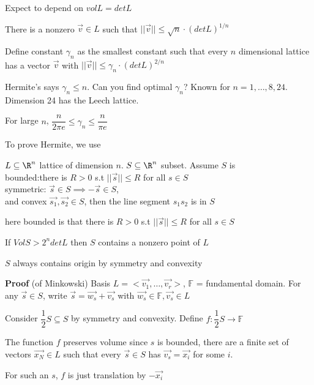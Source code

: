 \documentclass[10pt]{article}
\begin{document}
Expect to depend on $vol L = det L$

\begin{thm}
    There is a nonzero $\vec{v} \in L$ such that $||\vec{v}|| \leq \sqrt{n} \cdot (det L)^{1/n}$
\end{thm}

\begin{rmk}
    Define constant $\gamma_n$ as the smallest constant such that every $n$ dimensional lattice has a vector $\vec{v}$ with $||\vec{v} || \leq \gamma_n \cdot (det L)^{2/n}$
\end{rmk}
Hermite's says $\gamma_n \leq n$. Can you find optimal $\gamma_n$? Known for $n = 1, \ldots, 8, 24$. Dimension 24 has the Leech lattice. 

For large $n$, $\dfrac{n}{2\pi e} \leq \gamma_n \leq \dfrac{n}{\pi e}$

To prove Hermite, we use 

\begin{thm}
    $L \subseteq \R^n$ lattice of dimension $n$. $S \subseteq \R^n$ subset. Assume $S$ is \\
    bounded:there is $R > 0$ s.t $||\vec{s}|| \leq R$ for all $s\in S$\\
    symmetric: $\vec{s} \in S \implies -\vec{s} \in S$,\\
    and convex $\vec{s_1}, \vec{s_2} \in S$, then the line segment $s_1s_2$ is in $S$
\end{thm}
here bounded is that there is $R > 0$ s.t $||\vec{s}|| \leq R$ for all $s\in S$

If $Vol S > 2^n det L$ then $S$ contains a nonzero point of $L$

\begin{rmk}
    $S$ always contains origin by symmetry and convexity
\end{rmk}

\textbf{Proof} (of Minkowski) Basis $L = <\vec{v_1}, \ldots, \vec{v_r}>$, $\mathbb{F}$ = fundamental domain. For any $\vec{s} \in S$, write $\vec{s}  =\vec{w_s} + \vec{v_s}$ with $\vec{w_s} \in \mathbb{F}, \vec{v_s} \in L$

Consider $\dfrac{1}{2}S \subseteq S$ by symmetry and convexity. Define $f: \dfrac{1}{2}S \to \mathbb{F}$

The function $f$ preserves volume since $s$ is bounded, there are a finite set of vectors $\vec{x_N} \in L$ such that every $\vec{s} \in S$ has $\vec{v_s} = \vec{x_i}$ for some $i$. 

For such an $s$, $f$ is just translation by $-\vec{x_i}$
\end{document}
